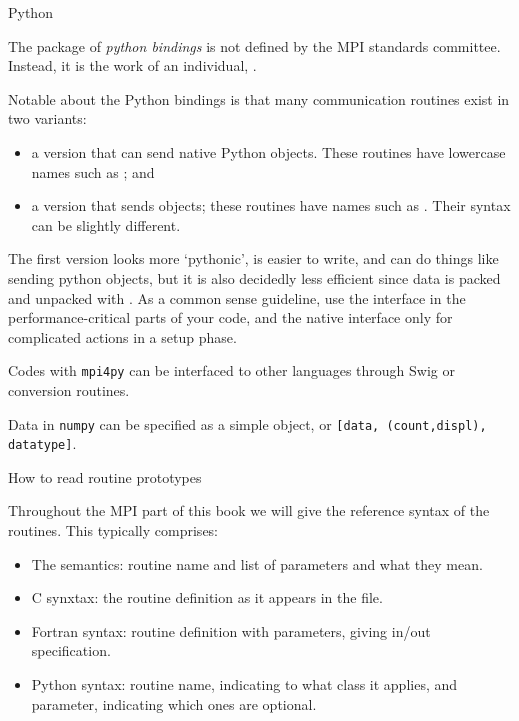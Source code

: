 
 {Python}
\label{sec:python-bind}

The  package of \emph{python bindings}
is not defined by the MPI
standards committee. Instead, it is the work of an individual,
.

Notable about the Python bindings is that many communication routines
exist in two variants:
\begin{itemize}
\item a version that can send native Python objects. These routines
  have lowercase names such as ; and
\item a version that sends  objects; these routines
  have names such as . Their syntax can be slightly different.
\end{itemize}
The first version looks more `pythonic', is easier to write,
and can do things like sending python objects,
but it is also decidedly less efficient since data is packed
and unpacked with . As a common sense guideline,
use the  interface in the performance-critical parts
of your code, and the native interface only for complicated
actions in a setup phase.

Codes with \texttt{mpi4py} can be interfaced to other languages
through Swig or conversion routines.

Data in \texttt{numpy} can be specified as a simple object,
or \texttt{[data, (count,displ), datatype]}.


 {How to read routine prototypes}
\label{sec:protos}

Throughout the MPI part of this book we will give the reference syntax
of the routines. This typically comprises:
\begin{itemize}
\item The semantics: routine name and list of parameters and what they
  mean.
\item C synxtax: the routine definition as it appears in the
   file.
\item Fortran syntax: routine definition with parameters, giving
  in/out specification.
\item Python syntax: routine name, indicating to what class it
  applies, and parameter, indicating which ones are optional.
\end{itemize}

